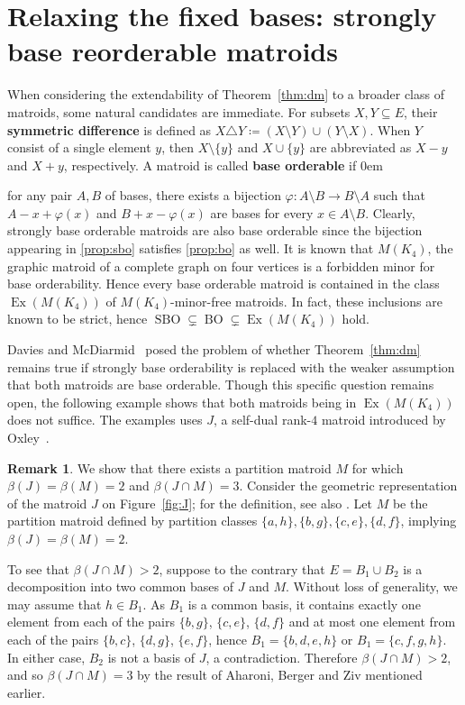 \documentclass[11pt,a4paper]{article}
\newenvironment{symenum}
 {\enumerate[label=(\noexpand\thisenumsymbol),align=parleft,labelindent=0pt,itemindent=0pt,labelsep=35pt,leftmargin=*]}
 {\endenumerate}
\newcommand\thisenumsymbol{}
\newcommand\itemsymbol[1]{%
  \renewcommand{\thisenumsymbol}{#1}%
  \item
}
\theoremstyle{plain}
\theoremstyle{definition}
\newtheorem{rem}[thm]{Remark}
\DeclareMathOperator*{\exx}{Ex}
\DeclareMathOperator*{\sbo}{SBO}
\DeclareMathOperator*{\bo}{BO}
\newcommand{\exk}{\exx(M(K_4))}
\begin{document}
\section{Relaxing the fixed bases: strongly base reorderable matroids} 
\label{sec:sbro}

When considering the extendability of Theorem~\ref{thm:dm} to a broader class of matroids, some natural candidates are immediate. For subsets $X,Y\subseteq E$, their \textbf{symmetric difference} is defined as $X\triangle Y\coloneqq (X\setminus Y)\cup (Y\setminus X)$. When $Y$ consist of a single element $y$, then $X\setminus \{y\}$ and $X\cup\{y\}$ are abbreviated as $X-y$ and $X+y$, respectively. A matroid is called \textbf{base orderable} if 
\begin{symenum}
\itemsep0em
    \itemsymbol{BO}\label{prop:bo} for any pair $A,B$ of bases, there exists a bijection $\varphi\colon A\setminus B \to B\setminus A$ such that $A-x+\varphi(x)$ and $B+x-\varphi(x)$ are bases for every $x\in A\setminus B$.
\end{symenum}
Clearly, strongly base orderable matroids are also base orderable since the bijection appearing in \ref{prop:sbo} satisfies \ref{prop:bo} as well. It is known that $M(K_4)$, the graphic matroid of a complete graph on four vertices is a forbidden minor for base orderability. Hence every base orderable matroid is contained in the class $\exk$ of $M(K_4)$-minor-free matroids. In fact, these inclusions are known to be strict, hence $\sbo\subsetneq\bo\subsetneq\exk$ hold. 

Davies and McDiarmid~\cite{davies1976disjoint} posed the problem of whether Theorem~\ref{thm:dm} remains true if strongly base orderability is replaced with the weaker assumption that both matroids are base orderable. Though this specific question remains open, the following example shows that both matroids being in $\exk$ does not suffice. The examples uses $J$, a self-dual rank-$4$ matroid introduced by Oxley~\cite{oxley1987characterization}.

\begin{rem}\label{rem:antidm}
\normalfont
We show that there exists a partition matroid $M$ for which $\beta(J)=\beta(M)=2$ and $\beta(J\cap M)=3$. Consider the geometric representation of the matroid $J$ on Figure~\ref{fig:J}; for the definition, see also \cite[page 650]{oxley2011matroid}. Let $M$ be the partition matroid defined by partition classes $\{a,h\}, \{b,g\}, \{c,e\}, \{d,f\}$, implying $\beta(J)=\beta(M)=2$.

To see that $\beta(J\cap M) > 2$, suppose to the contrary that $E=B_1 \cup B_2$ is a decomposition into two common bases of $J$ and $M$. Without loss of generality, we may assume that $h \in B_1$. As $B_1$ is a common basis, it contains exactly one element from each of the pairs $\{b,g\}$, $\{c,e\}$, $\{d,f\}$ and at most one element from each of the pairs $\{b,c\}$, $\{d,g\}$, $\{e,f\}$, hence $B_1 = \{b,d,e,h\}$ or $B_1 = \{c,f,g,h\}$. In either case, $B_2$ is not a basis of $J$, a contradiction. Therefore $\beta(J\cap M)>2$, and so $\beta(J\cap M)= 3$ by the result of Aharoni, Berger and Ziv mentioned earlier.  
\end{rem}
\end{document}
